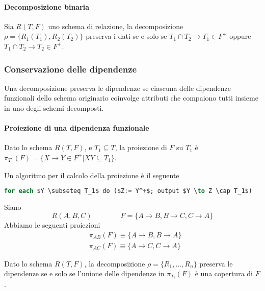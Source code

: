 \paragraph{Decomposizione binaria}
\begin{theorem}
	Sia $R(T, F)$ uno schema di relazione, la decomposizione $\rho = \{R_1(T_1), R_2 (T_2)\}$ preserva i dati se e solo se $T_1 \cap T_2 \to T_1 \in F^+$ oppure $T_1 \cap T_2 \to T_2 \in F^+$.
\end{theorem}

\subsubsection{Conservazione delle dipendenze}
Una decomposizione preserva le dipendenze se ciascuna delle dipendenze funzionali dello schema originario coinvolge attributi che compaiono tutti insieme in uno degli schemi decomposti.

\paragraph{Proiezione di una dipendenza funzionale}
\begin{definition}
	Dato lo schema $R(T, F)$, e $T_1 \subseteq T$, la proiezione di $F$ su $T_1$ è $\pi_{T_1} (F) = \{X \to Y \in F^+ \vert XY \subseteq T_1\}$.
\end{definition}

\noindent Un algoritmo per il calcolo della proiezione è il seguente
\begin{lstlisting}[language=SQL, mathescape]
	for each $Y \subseteq T_1$ do ($Z:= Y^+$; output $Y \to Z \cap T_1$)
\end{lstlisting}

\begin{example}[Proiezione di DF]
	Siano
	\begin{equation*}
		R(A,B,C) \qquad\qquad F=\{A \to B, B \to C, C \to A\}
	\end{equation*}
	Abbiamo le seguenti proiezioni
	\begin{align*}
		& \pi_{AB}(F) \equiv \{A \to B, B \to A\}\\
		& \pi_{AC}(F) \equiv \{A \to C, C \to A\}
	\end{align*}
\end{example}

\begin{definition}
	Dato lo schema $R(T, F)$, la decomposizione $\rho = \{R_1, \ldots, R_n\}$ preserva le dipendenze se e solo se l’unione delle dipendenze in $\pi_{T_i}(F)$ è una copertura di $F$.
\end{definition}

